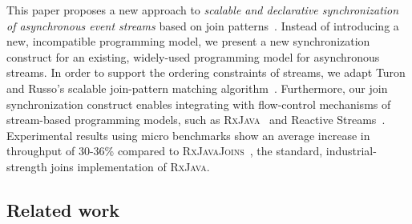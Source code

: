 \documentclass[runningheads]{llncs}
\begin{document}
\begin{sloppypar}
This paper proposes a new approach to {\em scalable and declarative synchronization
of asynchronous event streams} based on join patterns~\cite{Fournet:1996}. Instead of
introducing a new, incompatible programming model, we present a new
synchronization construct for an existing, widely-used programming model for
asynchronous streams. In order to support the ordering constraints of streams,
we adapt Turon and Russo's scalable join-pattern matching algorithm~\cite{Turon:2011}. Furthermore,
our join synchronization construct enables integrating with flow-control
mechanisms of stream-based programming models, such as \textsc{RxJava}~\cite{RxJava}
and Reactive Streams~\cite{ReactiveStreams}. Experimental results using micro
benchmarks show an average increase in throughput of 30-36\% compared to
\textsc{RxJavaJoins}~\cite{RxJavaJoins}, the standard, industrial-strength joins
implementation of \textsc{RxJava}.


\subsection{Related work}\label{sec:related}

\begin{table}[h]
\centering
{}
\caption{}
\label{tab:JoinCalculusImplementations}
\end{table}


\end{sloppypar}
\end{document}
